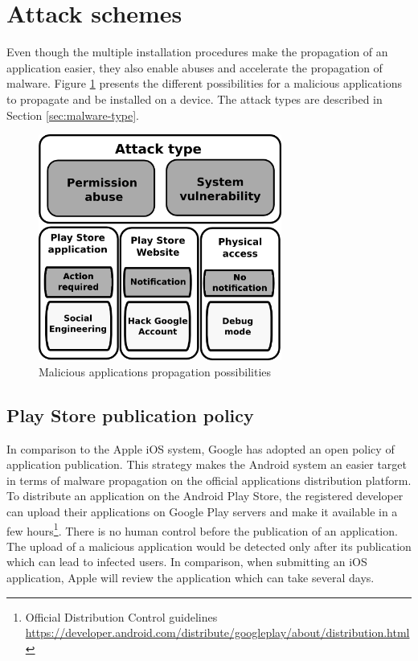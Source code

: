 \section{Attack schemes}
\label{sec:and-attack-scheme}

Even though the multiple installation procedures make the propagation of an application easier, they also enable abuses and accelerate the propagation of malware.
Figure \ref{fig:secu-graph} presents the different possibilities for a malicious applications to propagate and be installed on a device.
The attack types are described in Section \ref{sec:malware-type}.

\begin{figure}[h]
  \centering
  \includegraphics[width=8cm]{images/secu-graph.png}
  \caption{Malicious applications propagation possibilities}
  \label{fig:secu-graph}
\end{figure}

\subsection{Play Store publication policy}
\label{sec:playstore-publication-policy}

In comparison to the Apple iOS system, Google has adopted an open policy of application publication.
This strategy makes the Android system an easier target in terms of malware propagation on the official applications distribution platform.\\

To distribute an application on the Android Play Store, the registered developer can upload their applications on Google Play servers and make it available in a few hours\footnote{Official Distribution Control guidelines \url{https://developer.android.com/distribute/googleplay/about/distribution.html}}.
There is no human control before the publication of an application.
The upload of a malicious application would be detected only after its publication which can lead to infected users.
In comparison, when submitting an iOS application, Apple will review the application which can take several days.\\

